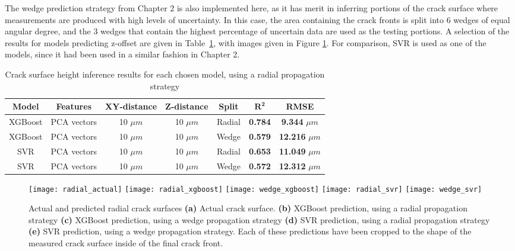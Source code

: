The wedge prediction strategy from Chapter 2 is also implemented here, as it has merit in inferring portions of the crack surface where measurements are produced with high levels of uncertainty.  In this case, the area containing the crack fronts is split into $6$ wedges of equal angular degree, and the 3 wedges that contain the highest percentage of uncertain data are used as the testing portions.  A selection of the results for models predicting z-offset are given in Table~\ref{table:radial-comparison}, with images given in Figure \ref{fig:radial_predictions}.  For comparison, SVR is used as one of the models, since it had been used in a similar fashion in Chapter 2.

\begin{table}[b]
  \centering
  \caption{Crack surface height inference results for each chosen model, using a radial propagation strategy}
  \label{table:radial-comparison}
  \begin{tabular}{| c | c | c | c | c | c | c |} \hline
    \textbf{Model} & \textbf{Features} & \textbf{XY-distance} & \textbf{Z-distance} & \textbf{Split}  & $\bm{R^2}$     & \textbf{RMSE}           \\ \hline
    XGBoost        & PCA vectors       & 10 $\mu m$           & 10 $\mu m$          & Radial          & \textbf{0.784} & \textbf{9.344}  $\mu m$ \\ \hline
    XGBoost        & PCA vectors       & 10 $\mu m$           & 10 $\mu m$          & Wedge           & \textbf{0.579} & \textbf{12.216} $\mu m$ \\ \hline
    SVR            & PCA vectors       & 10 $\mu m$           & 10 $\mu m$          & Radial          & \textbf{0.653} & \textbf{11.049} $\mu m$ \\ \hline
    SVR            & PCA vectors       & 10 $\mu m$           & 10 $\mu m$          & Wedge           & \textbf{0.572} & \textbf{12.312} $\mu m$ \\ \hline
  \end{tabular}
\end{table}

\begin{figure}[t]
  \centering
    \texttt{[image: radial\_actual]}
    \texttt{[image: radial\_xgboost]}
    \texttt{[image: wedge\_xgboost]}
    \texttt{[image: radial\_svr]}
    \texttt{[image: wedge\_svr]}
    \caption{Actual and predicted radial crack surfaces \textbf{(a)}  Actual crack surface.
             \textbf{(b)} XGBoost prediction, using a radial propagation strategy
             \textbf{(c)} XGBoost prediction, using a wedge propagation strategy
             \textbf{(d)} SVR prediction, using a radial propagation strategy
             \textbf{(e)} SVR prediction, using a wedge propagation strategy.
             Each of these predictions have been cropped to the shape of the measured crack surface inside of the final crack front. }
  \label{fig:radial_predictions}
\end{figure}

